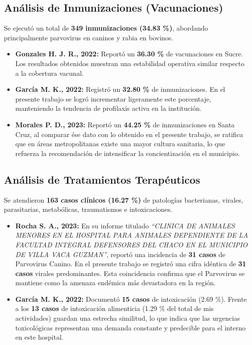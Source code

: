 	\subsection{Análisis de Inmunizaciones (Vacunaciones)}

	Se ejecutó un total de \textbf{349 inmunizaciones (34.83 \%)}, abordando principalmente parvovirus en caninos y rabia en bovinos.

	\begin{itemize}
		\item \textbf{Gonzales H. J. R., 2022:} Reportó un \textbf{36.30 \%} de vacunaciones en Sucre. Los resultados obtenidos muestran una estabilidad operativa similar respecto a la cobertura vacunal.
		\item \textbf{García M. K., 2022:} Registró un \textbf{32.80 \%} de inmunizaciones. En el presente trabajo se logró incrementar ligeramente este porcentaje, manteniendo la tendencia de profilaxis activa en la institución.
		\item \textbf{Morales P. D., 2023:} Reportó un \textbf{44.25 \%} de inmunizaciones en Santa Cruz, al comparar ése dato con lo obtenido en el presente trabajo, se ratifica que en áreas metropolitanas existe una mayor cultura sanitaria, lo que refuerza la recomendación de intensificar la concientización en el municipio.
	\end{itemize}

	\subsection{Análisis de Tratamientos Terapéuticos}

	Se atendieron \textbf{163 casos clínicos (16.27 \%)} de patologías bacterianas, virales, parasitarias, metabólicas, traumatismos e intoxicaciones.

	\begin{itemize}
		\item \textbf{Rocha S. A., 2023:} En su informe titulado \emph{“CLINICA DE ANIMALES MENORES EN EL HOSPITAL PARA ANIMALES DEPENDIENTE DE LA FACULTAD INTEGRAL DEFENSORES DEL CHACO EN EL MUNICIPIO DE VILLA VACA GUZMAN”}, reportó una incidencia de \textbf{31 casos} de Parvovirus Canino. En el presente trabajo se registró una cifra idéntica de \textbf{31 casos} virales predominantes. Esta coincidencia confirma que el Parvovirus se mantiene como la amenaza endémica más devastadora en la región.
		\item \textbf{García M. K., 2022:} Documentó \textbf{15 casos} de intoxicación (2.69 \%). Frente a los \textbf{13 casos} de intoxicación alimenticia (1.29 \% del total de mis actividades) guardan una estrecha similitud, lo que indica que las urgencias toxicológicas representan una demanda constante y predecible para el interno en este hospital.
	\end{itemize}

